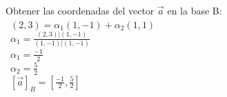 \documentclass[preview]{standalone}
\begin{document}
\begin{center}
Obtener las coordenadas del vector $\vec{a}$ en la base B: \\\  $(2,3) = \alpha_1 (1, -1) + \alpha_2 (1, 1)$ \\\  $\alpha_1 = \frac{(2,3)|(1,-1)}{(1, -1) | (1, -1)}$ \\\  $\alpha_1 = \frac{-1}{2}$ \\\  $\alpha_2 = \frac{5}{2}$ \\\  $[\vec{a}]_B =  [\frac{-1}{2}, \frac{5}{2}]$ \\\
\end{center}
\end{document}
